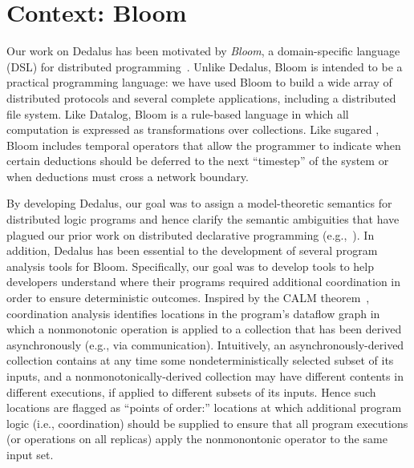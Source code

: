 \section{Context: Bloom}
Our work on Dedalus has been motivated by \emph{Bloom}, a domain-specific
language (DSL) for distributed programming~\cite{bloom}. Unlike Dedalus, Bloom
is intended to be a practical programming language: we have used Bloom to build
a wide array of distributed protocols and several complete applications,
including a distributed file system. Like Datalog, Bloom is a rule-based
language in which all computation is expressed as transformations over
collections.  Like sugared \lang, Bloom includes temporal operators that allow
the programmer to indicate when certain deductions should be deferred to the
next ``timestep'' of the system or when deductions must cross a network
boundary. %

By developing Dedalus, our goal was to assign a model-theoretic semantics for
distributed logic programs and hence clarify the semantic ambiguities that have
plagued our prior work on distributed declarative programming
(e.g.,~\cite{Mao2009,navarro-oper-sem}). In addition, Dedalus has been essential
to the development of several program analysis tools for Bloom. Specifically,
our goal was to develop tools to help developers understand where their programs
required additional coordination in order to ensure deterministic
outcomes. Inspired by the CALM theorem~\cite{calm}, coordination analysis
identifies locations in the program's dataflow graph in which a nonmonotonic
operation is applied to a collection that has been derived asynchronously (e.g.,
via communication).  Intuitively, an asynchronously-derived collection contains
at any time some nondeterministically selected subset of its inputs, and a
nonmonotonically-derived collection may have different contents in different
executions, if applied to different subsets of its inputs.  Hence such locations
are flagged as ``points of order:'' locations at which additional program logic
(i.e., coordination) should be supplied to ensure that all program executions
(or operations on all replicas) apply the nonmonontonic operator to the same
input set.

